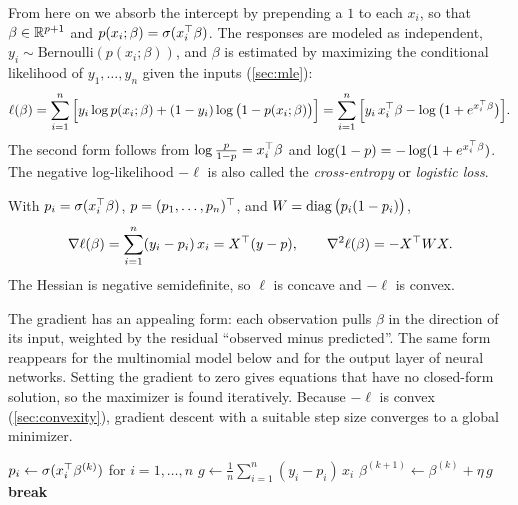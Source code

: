 From here on we absorb the intercept by prepending a $1$ to each $x_i$, so that $\beta\in\mathbb{R}^{p+1}$ and $p(x_i;\beta)=\sigma(x_i^{\top}\beta)$. The responses are modeled as independent, $y_i\sim\mathrm{Bernoulli}(p(x_i;\beta))$, and $\beta$ is estimated by maximizing the conditional likelihood of $y_1,\dots,y_n$ given the inputs (\cref{sec:mle}):
\[
\ell(\beta)=\sum_{i=1}^n\Big[y_i\log p(x_i;\beta)+(1-y_i)\log\big(1-p(x_i;\beta)\big)\Big]=\sum_{i=1}^n\Big[y_i\,x_i^{\top}\beta-\log\big(1+e^{x_i^{\top}\beta}\big)\Big].
\]
The second form follows from $\log\frac{p}{1-p}=x_i^{\top}\beta$ and $\log(1-p)=-\log(1+e^{x_i^{\top}\beta})$. The negative log-likelihood $-\ell$ is also called the \emph{cross-entropy} or \emph{logistic loss}.

\begin{proposition}\label{prop:logistic-grad}
With $p_i=\sigma(x_i^{\top}\beta)$, $p=(p_1,\dots,p_n)^{\top}$, and $W=\operatorname{diag}\big(p_i(1-p_i)\big)$,
\[
\nabla\ell(\beta)=\sum_{i=1}^n(y_i-p_i)\,x_i=X^{\top}(y-p),\qquad\nabla^2\ell(\beta)=-X^{\top} WX.
\]
The Hessian is negative semidefinite, so $\ell$ is concave and $-\ell$ is convex.
\end{proposition}

The gradient has an appealing form: each observation pulls $\beta$ in the direction of its input, weighted by the residual ``observed minus predicted''. The same form reappears for the multinomial model below and for the output layer of neural networks. Setting the gradient to zero gives equations that have no closed-form solution, so the maximizer is found iteratively. Because $-\ell$ is convex (\cref{sec:convexity}), gradient descent with a suitable step size converges to a global minimizer.

\begin{algorithm}[H]
\caption{Logistic Regression by Gradient Ascent}\label{alg:logistic-fit}
\begin{algorithmic}[1]
  \State $p_i\gets\sigma(x_i^{\top}\beta^{(k)})$ for $i=1,\dots,n$ 
  \State $g\gets\frac1n\sum_{i=1}^n(y_i-p_i)\,x_i$ 
  \State $\beta^{(k+1)}\gets\beta^{(k)}+\eta\,g$ 
   \textbf{break} \EndIf
\EndFor
{}
\end{algorithmic}
\end{algorithm}

